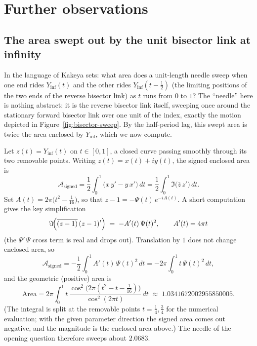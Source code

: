 \documentclass[11pt]{article}
\theoremstyle{definition}
\begin{document}
\clearpage

\section{Further observations}\label{sec:consequences}

\subsection{The area swept out by the unit bisector link at infinity}\label{sec:yinyang-area}

In the language of Kakeya sets: what area does a unit-length needle sweep when
one end rides $Y_{\inf}(t)$ and the other rides $Y_{\inf}(t-\tfrac12)$ (the
limiting positions of the two ends of the reverse bisector link) as $t$
runs from $0$ to $1$? The ``needle'' here is nothing abstract: it is the
reverse bisector link itself, sweeping once around the stationary forward
bisector link over one unit of the index, exactly the motion depicted in
Figure~\ref{fig:bisector-sweep}. By the half-period lag, this swept area is
twice the area enclosed by $Y_{\inf}$, which we now compute.

Let $z(t)=Y_{\inf}(t)$ on $t\in[0,1]$, a closed curve passing smoothly through
its two removable points. Writing $z(t)=x(t)+iy(t)$, the signed enclosed area
is
\begin{equation}\label{eq:area-def}
\mathcal A_{\mathrm{signed}}
=\frac12\int_{0}^{1}\bigl(x\,y'-y\,x'\bigr)\,dt
=\frac12\int_{0}^{1}\Im\!\bigl(\overline{z}\,z'\bigr)\,dt .
\end{equation}
Set $A(t)=2\pi\bigl(t^{2}-\tfrac{1}{16}\bigr)$, so that
$z-1=-\Psi(t)\,e^{-iA(t)}$. A short computation gives the key simplification
\begin{equation}\label{eq:area-key}
\Im\!\Bigl(\overline{(z-1)}\,(z-1)'\Bigr)
\;=\;
-A'(t)\,\Psi(t)^{2},
\qquad A'(t)=4\pi t
\end{equation}
(the $\Psi'\,\Psi$ cross term is real and drops out). Translation by $1$ does
not change enclosed area, so
\begin{equation}\label{eq:area-signed}
\mathcal A_{\mathrm{signed}}
=-\frac12\int_{0}^{1}A'(t)\,\Psi(t)^{2}\,dt
=-2\pi\int_{0}^{1}t\,\Psi(t)^{2}\,dt ,
\end{equation}
and the geometric (positive) area is
\begin{equation}\label{eq:area-value}
\boxed{\;
\mathrm{Area}
=2\pi\int_{0}^{1}t\,
\frac{\cos^{2}\!\bigl(2\pi(t^{2}-t-\tfrac{1}{16})\bigr)}{\cos^{2}(2\pi t)}
\,dt
\;\approx\;
1.0341672002955850005 .\;}
\end{equation}
(The integral is split at the removable points $t=\tfrac14,\tfrac34$ for the
numerical evaluation; with the given parameter direction the signed area comes
out negative, and the magnitude is the enclosed area above.) The needle of the
opening question therefore sweeps about $2.0683$.
\end{document}
